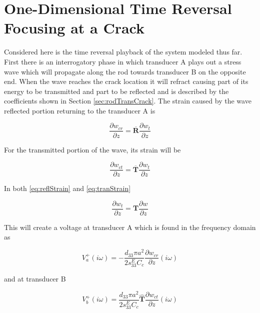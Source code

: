 \section{One-Dimensional Time Reversal Focusing at a Crack}
Considered here is the time reversal playback of the system modeled thus far. First there is an interrogatory phase in which transducer A plays out a stress wave which will propagate along the rod towards transducer B on the opposite end. When the wave reaches the crack location it will refract causing part of its energy to be transmitted and part to be reflected and is described by the coefficients shown in Section \ref{sec:rodTransCrack}. The strain caused by the wave reflected portion returning to the transducer A is

\begin{equation}
\frac{\partial w_{cr}}{\partial z} = \overline{\boldsymbol{R}}\frac{\partial w_t}{\partial z}
\label{eq:reflStrain}
\end{equation}

For the transmitted portion of the wave, its strain will be
  
\begin{equation}
\frac{\partial w_{ct}}{\partial z} = \overline{\boldsymbol{T}}\frac{\partial w_t}{\partial z}
\label{eq:tranStrain}
\end{equation}

In both \ref{eq:reflStrain} and \ref{eq:tranStrain}

\begin{equation}
\frac{\partial w_t}{\partial z} = \boldsymbol{T} \frac{\partial w}{\partial z}
\end{equation}



This will create a voltage at transducer A which is found in the frequency domain as

\begin{equation}
V^+_a(i\omega) = -\frac{d_{33} \pi a^2}{2 s^E_{33} C_c} \frac{\partial w_{cr}}{\partial z} (i\omega)
\end{equation}

and at transducer B

\begin{equation}
V^+_b(i\omega) = \frac{d_{33} \pi a^2}{2 s^E_{33} C_c} \boldsymbol{\hat{T}}\frac{\partial w_{ct}}{\partial z} (i\omega)
\end{equation}

